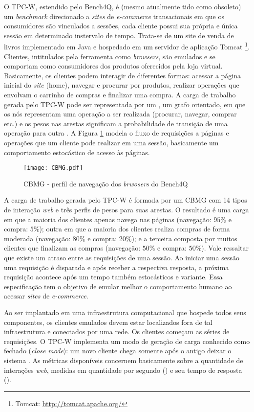 O TPC-W, estendido pelo Bench4Q, é (mesmo atualmente tido como obsoleto) um \textit{ benchmark} direcionado a \textit{sites} de \textit{e-commerce} transacionais em que os consumidores são vinculados a sessões, cada cliente possui sua própria e única sessão em determinado instervalo de tempo. Trata-se de um site de venda de livros implementado em Java e hospedado em um servidor de aplicação Tomcat \footnote{Tomcat: \url{http://tomcat.apache.org/}}. Clientes, intitulados pela ferramenta como \textit{browsers}, são emulados e se comportam como consumidores dos produtos oferecidos pela loja virtual. Basicamente, os clientes podem interagir de diferentes formas: acessar a página inicial do \textit{site} (home), navegar e procurar por produtos, realizar operações que envolvam o carrinho de compras e finalizar uma compra. A carga de trabalho gerada pelo TPC-W pode ser representada por um , um grafo orientado, em que os nós representam uma operação a ser realizada (procurar, navegar, comprar etc.) e os pesos nas arestas significam a probabilidade de transição de uma operação para outra \cite{Zhang2011}. A Figura \ref{fig:CBMG} modela o fluxo de requisições a páginas e operações que um cliente pode realizar em uma sessão, basicamente um comportamento estocástico de acesso às páginas.

\begin{figure}[htb]
	\centering
	\texttt{[image: CBMG.pdf]}
	\caption{CBMG - perfil de navegação dos \textit{brwosers} do Bench4Q}
	\label{fig:CBMG}
\end{figure}


A carga de trabalho gerada pelo TPC-W é formada por um CBMG com 14 tipos de interação \textit{web} e três perfis de pesos para suas arestas. O resultado é uma carga em que a maioria dos clientes apenas navega nas páginas (navegação: $95\%$ e compra: $5\%$); outra em que a maioria dos clientes realiza compras de forma moderada (navegação: $80\%$ e compra: $20\%$); e a terceira composta por muitos clientes que finalizam as compras (navegação: $50\%$ e compra: $50\%$). Vale ressaltar que existe um atraso entre as requisições de uma sessão. Ao iniciar uma sessão uma requisição é disparada e após receber a respectiva resposta, a próxima requisição acontece após um tempo também estocásticos e variante. Essa especificação tem o objetivo de emular melhor o comportamento humano ao acessar \textit{sites} de \textit{ e-commerce}.

Ao ser implantado em uma infraestrutura computacional que hospede todos seus componentes, os clientes emulados devem estar localizados fora de tal infraestrutura e conectados por uma rede. Os clientes começam as séries de requisições. O TPC-W implementa um modo de geração de carga conhecido como fechado (\textit{close mode}): um novo cliente chega somente após o antigo deixar o sistema \cite{Zhang2011}. As métricas disponíveis concernem basicamente sobre a quantidade de interações \textit{web}, medidas em quantidade por segundo () e seu tempo de resposta ().

